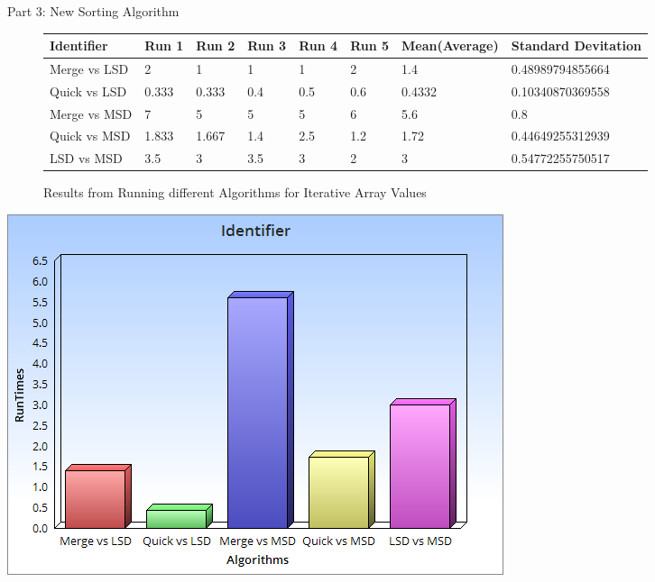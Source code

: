 \documentclass{article}
\begin{document}
\begin{center}
Part 3: New Sorting Algorithm
\end{center}
\begin{center}
\begin{figure}[H]
\begin{tabular}{| l | l | l | l | l | l | l | l |}
\hline
Identifier & Run 1 & Run 2 & Run 3 & Run 4 & Run 5 & Mean(Average) & Standard Devitation\\ \hline
Merge vs LSD & 2 & 1 & 1  & 1 & 2 & 1.4 & 0.48989794855664 \\ \hline
Quick vs LSD & 0.333 & 0.333 & 0.4  & 0.5 & 0.6 & 0.4332 & 0.10340870369558 \\ \hline
Merge vs MSD & 7 & 5 & 5 & 5 & 6 & 5.6 & 0.8\\ \hline
Quick vs MSD& 1.833 & 1.667 & 1.4  & 2.5 & 1.2 & 1.72 & 0.44649255312939\\ \hline
LSD vs MSD & 3.5 & 3 & 3.5 & 3 & 2 & 3 & 0.54772255750517\\ \hline
\end{tabular}
\caption{Results from Running  different Algorithms for Iterative Array Values}

\end{figure}
\end{center}
\begin{center}
\includegraphics[scale=0.6]{Identifier.png}
\end{center}
\end{document}
